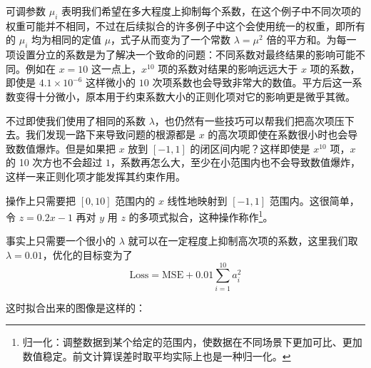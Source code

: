 可调参数 $\mu_i$ 表明我们希望在多大程度上抑制每个系数，在这个例子中不同次项的权重可能并不相同，不过在后续拟合的许多例子中这个会使用统一的权重，即所有的 $\mu_i$ 均为相同的定值 $\mu$，式子从而变为了一个常数 $\lambda = \mu^2$ 倍的平方和。为每一项设置分立的系数是为了解决一个致命的问题：不同系数对最终结果的影响可能不同。例如在 $x=10$ 这一点上，$x^{10}$ 项的系数对结果的影响远远大于 $x$ 项的系数，即使是 $4.1\times 10^{-6}$ 这样微小的 $10$ 次项系数也会导致非常大的数值。平方后这一系数变得十分微小，原本用于约束系数大小的正则化项对它的影响更是微乎其微。

不过即使我们使用了相同的系数 $\lambda$，也仍然有一些技巧可以帮我们把高次项压下去。我们发现一路下来导致问题的根源都是 $x$ 的高次项即使在系数很小时也会导致数值爆炸。但是如果把 $x$ 放到 $[-1, 1]$ 的闭区间内呢？这样即使是 $x^{10}$ 项，$x$ 的 10 次方也不会超过 $1$，系数再怎么大，至少在小范围内也不会导致数值爆炸，这样一来正则化项才能发挥其约束作用。

操作上只需要把 $[0, 10]$ 范围内的 $x$ 线性地映射到 $[-1, 1]$ 范围内。这很简单，令 $z = 0.2 x - 1$ 再对 $y$ 用 $z$ 的多项式拟合，这种操作称作\footnote{归一化：调整数据到某个给定的范围内，使数据在不同场景下更加可比、更加数值稳定。前文计算误差时取平均实际上也是一种归一化。}。

事实上只需要一个很小的 $\lambda$ 就可以在一定程度上抑制高次项的系数，这里我们取 $\lambda = 0.01$，优化的目标变为了
\[
    \text{Loss} = \text{MSE} + 0.01 \sum_{i=1}^{10} a_i^2
\]

这时拟合出来的图像是这样的：

